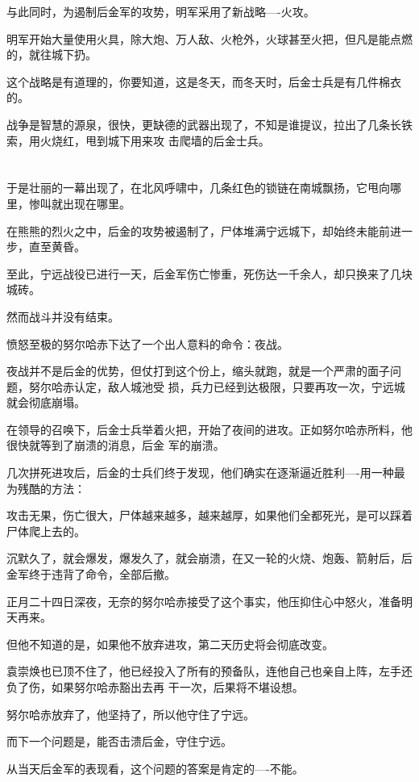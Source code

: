 \documentclass[11pt,a4paper,onecolumn]{article}
\begin{document}
与此同时，为遏制后金军的攻势，明军采用了新战略----火攻。

明军开始大量使用火具，除大炮、万人敌、火枪外，火球甚至火把，但凡是能点燃的，就往城下扔。

这个战略是有道理的，你要知道，这是冬天，而冬天时，后金士兵是有几件棉衣的。

战争是智慧的源泉，很快，更缺德的武器出现了，不知是谁提议，拉出了几条长铁索，用火烧红，甩到城下用来攻
击爬墙的后金士兵。

\section[\thesection]{}

于是壮丽的一幕出现了，在北风呼啸中，几条红色的锁链在南城飘扬，它甩向哪里，惨叫就出现在哪里。

在熊熊的烈火之中，后金的攻势被遏制了，尸体堆满宁远城下，却始终未能前进一步，直至黄昏。

至此，宁远战役已进行一天，后金军伤亡惨重，死伤达一千余人，却只换来了几块城砖。

然而战斗并没有结束。

愤怒至极的努尔哈赤下达了一个出人意料的命令：夜战。

夜战并不是后金的优势，但仗打到这个份上，缩头就跑，就是一个严肃的面子问题，努尔哈赤认定，敌人城池受
损，兵力已经到达极限，只要再攻一次，宁远城就会彻底崩塌。

在领导的召唤下，后金士兵举着火把，开始了夜间的进攻。正如努尔哈赤所料，他很快就等到了崩溃的消息，后金
军的崩溃。

几次拼死进攻后，后金的士兵们终于发现，他们确实在逐渐逼近胜利----用一种最为残酷的方法：

攻击无果，伤亡很大，尸体越来越多，越来越厚，如果他们全都死光，是可以踩着尸体爬上去的。

沉默久了，就会爆发，爆发久了，就会崩溃，在又一轮的火烧、炮轰、箭射后，后金军终于违背了命令，全部后撤。

正月二十四日深夜，无奈的努尔哈赤接受了这个事实，他压抑住心中怒火，准备明天再来。

但他不知道的是，如果他不放弃进攻，第二天历史将会彻底改变。

袁崇焕也已顶不住了，他已经投入了所有的预备队，连他自己也亲自上阵，左手还负了伤，如果努尔哈赤豁出去再
干一次，后果将不堪设想。

努尔哈赤放弃了，他坚持了，所以他守住了宁远。

而下一个问题是，能否击溃后金，守住宁远。

从当天后金军的表现看，这个问题的答案是肯定的----不能。
\end{document}
